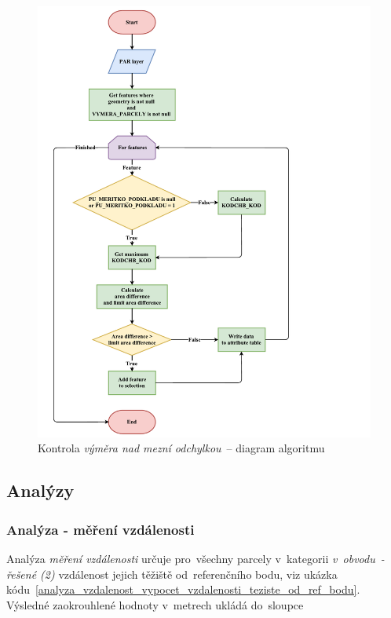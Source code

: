 	\begin{figure}[H]
		\centering
		\includegraphics[width=1.2\textwidth]{./pictures/vymera.pdf}
		\caption[Kontrola \textit{výměra nad mezní odchylkou}~– diagram algoritmu]{Kontrola \textit{výměra nad mezní odchylkou}~– diagram algoritmu}
		\label{fig:diagram_vymera}
 	\end{figure}

\subsection{Analýzy}
\label{analyzy}

\subsubsection{Analýza - měření vzdálenosti}
\label{analyza_vzdalenosti}

Analýza \textit{měření vzdálenosti} určuje pro~všechny parcely v~kategorii \textit{v~obvodu~- řešené (2)} vzdálenost jejich těžiště od~referenčního bodu, viz ukázka kódu~\ref{analyza_vzdalenost_vypocet_vzdalenosti_teziste_od_ref_bodu}. Výsledné zaokrouhlené hodnoty v~metrech ukládá do~sloupce \texttt{}

